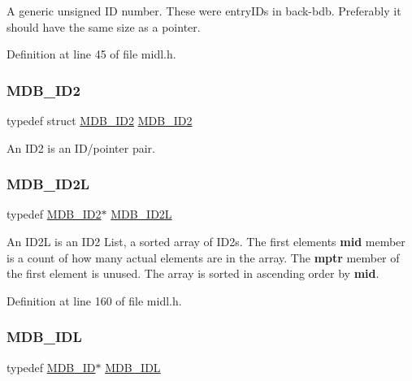 A generic unsigned ID number. These were entry\+I\+Ds in back-\/bdb. Preferably it should have the same size as a pointer. 

Definition at line 45 of file midl.\+h.

\mbox{\label{group__idls_gaf7a69e9dd73fcefb2ed10058331ddac2}} 
\subsubsection{\texorpdfstring{M\+D\+B\+\_\+\+I\+D2}{MDB\_ID2}}
{\footnotesize\ttfamily typedef struct \mbox{\hyperlink{struct_m_d_b___i_d2}{M\+D\+B\+\_\+\+I\+D2}}  \mbox{\hyperlink{struct_m_d_b___i_d2}{M\+D\+B\+\_\+\+I\+D2}}}

An I\+D2 is an I\+D/pointer pair. \mbox{\label{group__idls_gafcc5d61c06c726db2be5d088dbc68d51}} 
\subsubsection{\texorpdfstring{M\+D\+B\+\_\+\+I\+D2L}{MDB\_ID2L}}
{\footnotesize\ttfamily typedef \mbox{\hyperlink{struct_m_d_b___i_d2}{M\+D\+B\+\_\+\+I\+D2}}$\ast$ \mbox{\hyperlink{group__idls_gafcc5d61c06c726db2be5d088dbc68d51}{M\+D\+B\+\_\+\+I\+D2L}}}

An I\+D2L is an I\+D2 List, a sorted array of I\+D2s. The first element\textquotesingle{}s {\bfseries mid} member is a count of how many actual elements are in the array. The {\bfseries mptr} member of the first element is unused. The array is sorted in ascending order by {\bfseries mid}. 

Definition at line 160 of file midl.\+h.

\mbox{\label{group__idls_ga238cc39c422225e05cb3897e641ca9e5}} 
\subsubsection{\texorpdfstring{M\+D\+B\+\_\+\+I\+DL}{MDB\_IDL}}
{\footnotesize\ttfamily typedef \mbox{\hyperlink{group__idls_ga792192229a977c49f083846b5635f92d}{M\+D\+B\+\_\+\+ID}}$\ast$ \mbox{\hyperlink{group__idls_ga238cc39c422225e05cb3897e641ca9e5}{M\+D\+B\+\_\+\+I\+DL}}}

